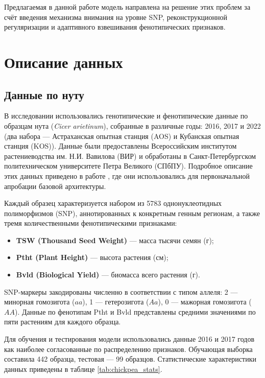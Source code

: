 Предлагаемая в данной работе модель направлена на решение этих проблем за счёт введения механизма внимания на уровне SNP, реконструкционной регуляризации и адаптивного взвешивания фенотипических признаков.

\section{Описание данных}
\label{ch1:sec2}
\subsection{Данные по нуту}

В исследовании использовались генотипические и фенотипические данные по образцам нута (\textit{Cicer arietinum}), собранные в различные годы: 2016, 2017 и 2022 (два набора --- Астраханская опытная станция (AOS) и Кубанская опытная станция (KOS)). Данные были предоставлены Всероссийским институтом растениеводства им. Н.И. Вавилова (ВИР) и обработаны в Санкт-Петербургском политехническом университете Петра Великого (СПбПУ). Подробное описание этих данных приведено в работе \cite{Reutov2025}, где они использовались для первоначальной апробации базовой архитектуры.

Каждый образец характеризуется набором из 5783 однонуклеотидных полиморфизмов (SNP), аннотированных к конкретным генным регионам, а также тремя количественными фенотипическими признаками:
\begin{itemize}
	\item \textbf{TSW (Thousand Seed Weight)} --- масса тысячи семян (г);
	\item \textbf{Ptht (Plant Height)} --- высота растения (см);
	\item \textbf{Bvld (Biological Yield)} --- биомасса всего растения (г).
\end{itemize}

SNP-маркеры закодированы численно в соответствии с типом аллеля: 2 --- минорная гомозигота ($aa$), 1 --- гетерозигота ($Aa$), 0 --- мажорная гомозигота ($AA$). Данные по фенотипам Ptht и Bvld представлены средними значениями по пяти растениям для каждого образца.

Для обучения и тестирования модели использовались данные 2016 и 2017 годов как наиболее согласованные по распределению признаков. Обучающая выборка составила 442 образца, тестовая --- 99 образцов. Статистические характеристики данных приведены в таблице \ref{tab:chickpea_stats}.

